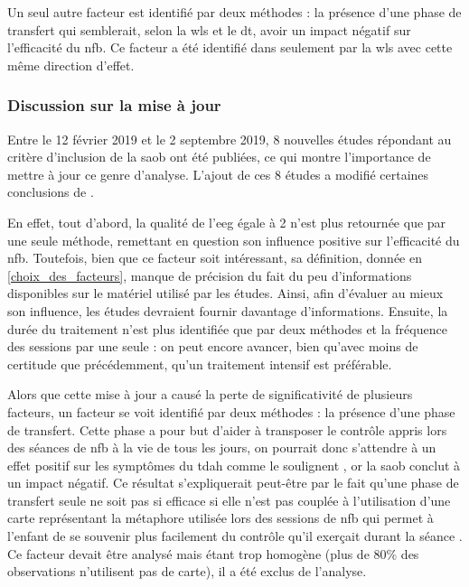 Un seul autre facteur est identifié par deux méthodes : la présence d'une phase de transfert qui semblerait, selon la \gls{wls} et le \gls{dt}, avoir un impact négatif sur l'efficacité 
du \gls{nfb}. Ce facteur a été identifié dans \citet{Bussalb2019clinical} seulement par la \gls{wls} avec cette même direction d'effet.

\subsubsection{Discussion sur la mise à jour}

Entre le 12 février 2019 et le 2 septembre 2019, 8 nouvelles études répondant au critère d'inclusion de la \gls{saob} ont été publiées, ce qui montre l'importance de mettre à jour ce 
genre d'analyse. L'ajout de ces 8 études a modifié certaines conclusions de \citet{Bussalb2019clinical}. 

En effet, tout d'abord, la qualité de l'\gls{eeg} égale à 2 n'est plus retournée que par une seule méthode,
remettant en question son influence positive sur l'efficacité du \gls{nfb}. Toutefois, bien que ce facteur soit intéressant, sa définition, donnée en \ref{choix_des_facteurs}, manque de précision 
du fait du peu d'informations disponibles sur le matériel utilisé par les études. Ainsi, afin d'évaluer au mieux son influence, les études devraient fournir davantage d'informations. Ensuite, 
la durée du traitement n'est plus identifiée que par deux méthodes et la fréquence des sessions par une seule : on peut encore avancer, bien qu'avec moins de certitude que précédemment, 
qu'un traitement intensif est préférable. 

Alors que cette mise à jour a causé la perte de significativité de plusieurs facteurs, un facteur se voit identifié par deux méthodes : la présence d'une phase de transfert. 
Cette phase a pour but d'aider à transposer le contrôle appris lors des séances de \gls{nfb} à la vie de tous les jours, on pourrait donc s'attendre à un effet positif sur les symptômes
du \gls{tdah} comme le soulignent \citet{Arns2014, Strehl2006, Gani2008}, or la \gls{saob} conclut à un impact négatif. Ce résultat s'expliquerait peut-être par le fait qu'une phase de 
transfert seule ne soit pas si efficace si elle n'est pas couplée à l'utilisation d'une carte représentant la métaphore utilisée lors des sessions de \gls{nfb} qui permet à l'enfant de se 
souvenir plus facilement du contrôle qu'il exerçait durant la séance \citep{Bioulac2019, Bluschke2016}. Ce facteur devait être analysé mais étant trop homogène (plus de 80\% des observations 
n'utilisent pas de carte), il a été exclus de l'analyse. 

